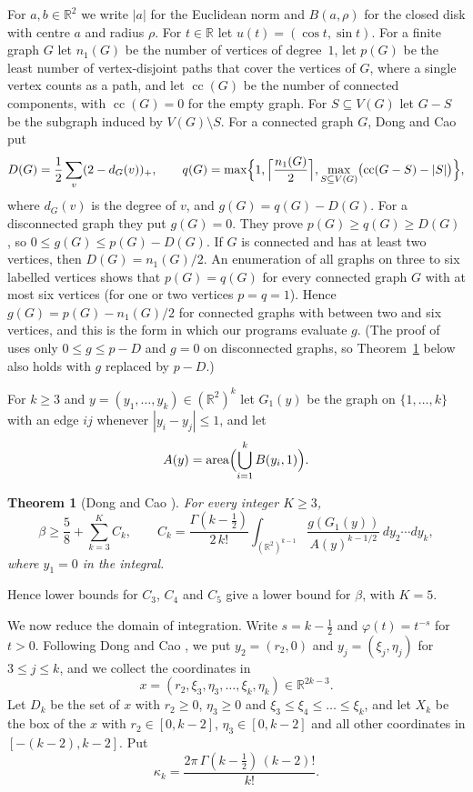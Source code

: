 \documentclass[11pt]{amsart}
\newtheorem{theorem}{Theorem}[section]
\theoremstyle{definition}
\theoremstyle{remark}
\numberwithin{equation}{section}
\newcommand{\R}{\mathbb{R}}
\newcommand{\area}{\operatorname{area}}
\begin{document}
For $a,b\in\R^2$ we write $|a|$ for the Euclidean norm and $B(a,\rho)$ for the closed disk with centre $a$ and radius $\rho$. For $t\in\R$ let $u(t)=(\cos t,\sin t)$. For a finite graph $G$ let $n_1(G)$ be the number of vertices of degree~$1$, let $p(G)$ be the least number of vertex-disjoint paths that cover the vertices of $G$, where a single vertex counts as a path, and let $\operatorname{cc}(G)$ be the number of connected components, with $\operatorname{cc}(G)=0$ for the empty graph. For $S\subseteq V(G)$ let $G-S$ be the subgraph induced by $V(G)\setminus S$. For a connected graph $G$, Dong and Cao \cite[Definition~5]{DC26} put
\[
D(G)=\frac12\sum_{v}(2-d_G(v))_+,\qquad q(G)=\max\Bigl\{1,\Bigl\lceil\frac{n_1(G)}2\Bigr\rceil,\max_{S\subseteq V(G)}\bigl(\operatorname{cc}(G-S)-|S|\bigr)\Bigr\},
\]
where $d_G(v)$ is the degree of $v$, and $g(G)=q(G)-D(G)$. For a disconnected graph they put $g(G)=0$. They prove $p(G)\ge q(G)\ge D(G)$ \cite[Lemma~3]{DC26}, so $0\le g(G)\le p(G)-D(G)$. If $G$ is connected and has at least two vertices, then $D(G)=n_1(G)/2$. An enumeration of all graphs on three to six labelled vertices shows that $p(G)=q(G)$ for every connected graph $G$ with at most six vertices (for one or two vertices $p=q=1$). Hence $g(G)=p(G)-n_1(G)/2$ for connected graphs with between two and six vertices, and this is the form in which our programs evaluate $g$. (The proof of \cite[Theorem~3]{DC26} uses only $0\le g\le p-D$ and $g=0$ on disconnected graphs, so Theorem~\ref{thm:dc} below also holds with $g$ replaced by $p-D$.)

For $k\ge3$ and $y=(y_1,\dots,y_k)\in(\R^2)^k$ let $G_1(y)$ be the graph on $\{1,\dots,k\}$ with an edge $ij$ whenever $|y_i-y_j|\le1$, and let
\[
A(y)=\area\Bigl(\bigcup_{i=1}^kB(y_i,1)\Bigr).
\]

\begin{theorem}[Dong and Cao {\cite[Theorem~3]{DC26}}]\label{thm:dc}
For every integer $K\ge3$,
\[
\beta\ge\frac58+\sum_{k=3}^KC_k,\qquad C_k=\frac{\Gamma(k-\frac12)}{2\,k!}\int_{(\R^2)^{k-1}}\frac{g(G_1(y))}{A(y)^{k-1/2}}\,dy_2\cdots dy_k,
\]
where $y_1=0$ in the integral.
\end{theorem}

Hence lower bounds for $C_3$, $C_4$ and $C_5$ give a lower bound for $\beta$, with $K=5$.

We now reduce the domain of integration. Write $s=k-\frac12$ and $\varphi(t)=t^{-s}$ for $t>0$. Following Dong and Cao \cite[Section~3.3]{DC26}, we put $y_2=(r_2,0)$ and $y_j=(\xi_j,\eta_j)$ for $3\le j\le k$, and we collect the coordinates in
\[
x=(r_2,\xi_3,\eta_3,\dots,\xi_k,\eta_k)\in\R^{2k-3}.
\]
Let $D_k$ be the set of $x$ with $r_2\ge0$, $\eta_3\ge0$ and $\xi_3\le\xi_4\le\dots\le\xi_k$, and let $X_k$ be the box of the $x$ with $r_2\in[0,k-2]$, $\eta_3\in[0,k-2]$ and all other coordinates in $[-(k-2),k-2]$. Put
\[
\kappa_k=\frac{2\pi\,\Gamma(k-\frac12)\,(k-2)!}{k!}.
\]
\end{document}
